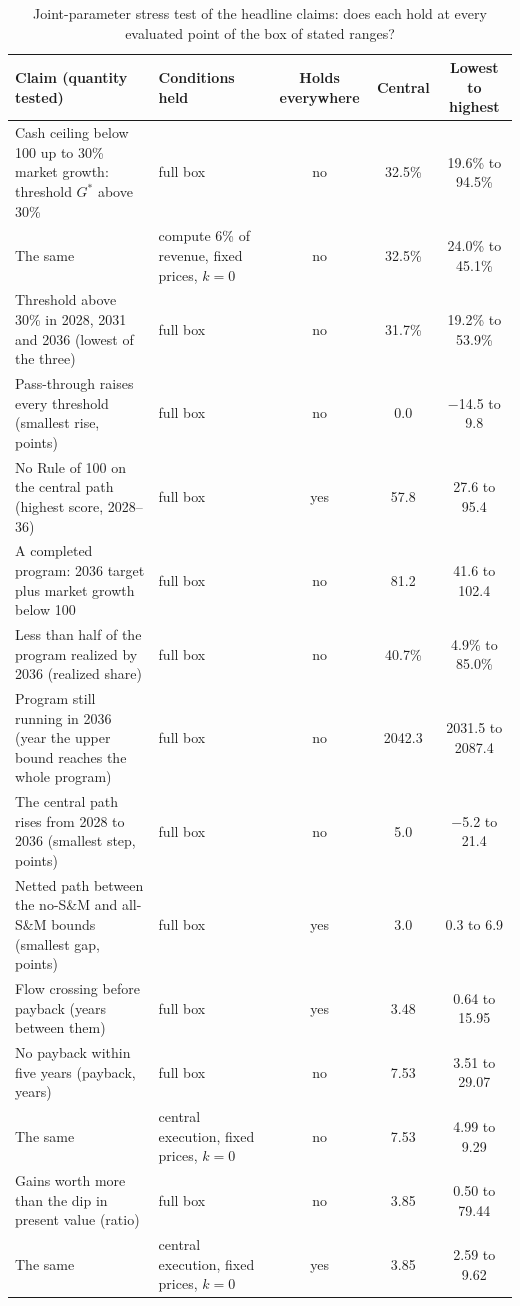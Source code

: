 \begin{table}[t]\centering\footnotesize\setlength{\tabcolsep}{3pt}
\caption{Joint-parameter stress test of the headline claims: does each hold at every evaluated point of the box of stated ranges?}\label{tab:stress}
\begin{tabular}{@{}>{\raggedright\arraybackslash}p{6.3cm}>{\raggedright\arraybackslash}p{3.3cm}ccc@{}}\toprule
Claim (quantity tested) & Conditions held & Holds everywhere & Central & Lowest to highest\\\midrule
Cash ceiling below 100 up to 30\% market growth: threshold $G^*$ above 30\% & full box & no & 32.5\% & 19.6\% to 94.5\% \\
The same & compute 6\% of revenue, fixed prices, $k=0$ & no & 32.5\% & 24.0\% to 45.1\% \\
Threshold above 30\% in 2028, 2031 and 2036 (lowest of the three) & full box & no & 31.7\% & 19.2\% to 53.9\% \\
Pass-through raises every threshold (smallest rise, points) & full box & no & 0.0 & $-$14.5 to 9.8 \\
No Rule of 100 on the central path (highest score, 2028--36) & full box & yes & 57.8 & 27.6 to 95.4 \\
A completed program: 2036 target plus market growth below 100 & full box & no & 81.2 & 41.6 to 102.4 \\
Less than half of the program realized by 2036 (realized share) & full box & no & 40.7\% & 4.9\% to 85.0\% \\
Program still running in 2036 (year the upper bound reaches the whole program) & full box & no & 2042.3 & 2031.5 to 2087.4 \\
The central path rises from 2028 to 2036 (smallest step, points) & full box & no & 5.0 & $-$5.2 to 21.4 \\
Netted path between the no-S\&M and all-S\&M bounds (smallest gap, points) & full box & yes & 3.0 & 0.3 to 6.9 \\
Flow crossing before payback (years between them) & full box & yes & 3.48 & 0.64 to 15.95 \\
No payback within five years (payback, years) & full box & no & 7.53 & 3.51 to 29.07 \\
The same & central execution, fixed prices, $k=0$ & no & 7.53 & 4.99 to 9.29 \\
Gains worth more than the dip in present value (ratio) & full box & no & 3.85 & 0.50 to 79.44 \\
The same & central execution, fixed prices, $k=0$ & yes & 3.85 & 2.59 to 9.62 \\

\end{tabular}
\end{table}
